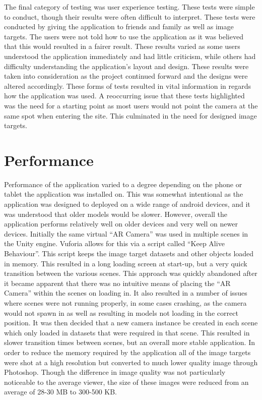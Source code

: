 The final category of testing was user experience testing. These tests were simple to conduct, though their results were often difficult to interpret. These tests were conducted by giving the application to friends and family as well as image targets. The users were not told how to use the application as it was believed that this would resulted in a fairer result. These results varied as some users understood the application immediately and had little criticism, while others had difficulty understanding the application's layout and design. These results were taken into consideration as the project continued forward and the designs were altered accordingly. These forms of tests resulted in vital information in regards how the application was used. A reoccurring issue that these tests highlighted was the need for a starting point as most users would not point the camera at the same spot when entering the site. This culminated in the need for designed image targets. 

\section{Performance}
Performance of the application varied to a degree depending on the phone or tablet the application was installed on. This was somewhat intentional as the application was designed to deployed on a wide range of android devices, and it was understood that older models would be slower. However, overall the application performs relatively well on older devices and very well on newer devices.
Initially the same virtual “AR Camera” was used in multiple scenes in the Unity engine. Vuforia allows for this via a script called “Keep Alive Behaviour”. This script keeps the image target datasets and other objects loaded in memory. This resulted in a long loading screen at start-up, but a very quick transition between the various scenes. This approach was quickly abandoned after it became apparent that there was no intuitive means of placing the “AR Camera” within the scenes on loading in. It also resulted in a number of issues where scenes were not running properly, in some cases crashing, as the camera would not spawn in as well as resulting in models not loading in the correct position.
It was then decided that a new camera instance be created in each scene which only loaded in datasets that were required in that scene. This resulted in slower transition times between scenes, but an overall more stable application.
In order to reduce the memory required by the application all of the image targets were shot at a high resolution but converted to much lower quality image through Photoshop. Though the difference in image quality was not particularly noticeable to the average viewer, the size of these images were reduced from an average of 28-30 MB to 300-500 KB. 

